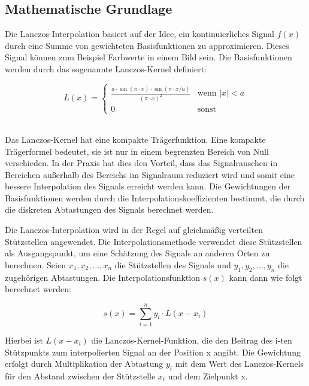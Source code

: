 \subsection{Mathematische Grundlage}

    Die Lanczos-Interpolation basiert auf der Idee, ein kontinuierliches Signal $f(x)$ durch eine Summe von gewichteten Basisfunktionen zu approximieren. 
    Dieses Signal können zum Beispiel Farbwerte in einem Bild sein.
    Die Basisfunktionen werden durch das sogenannte Lanczos-Kernel definiert:

\begin{equation}
    L(x) = \begin{cases} \frac{a \cdot \sin(\pi \cdot x) \cdot \sin(\pi \cdot x / a)}{(\pi \cdot x)^2} & \text{wenn } \left| x \right| < a \\ 0 & \text{sonst} \end{cases}
\end{equation}
~

Das Lanczos-Kernel hat eine kompakte Trägerfunktion.
Eine kompakte Trägerformel bedeutet, sie ist nur in einem begrenzten Bereich von Null verschieden. 
In der Praxis hat dies den Vorteil, dass das Signalrauschen in Bereichen außerhalb des Bereichs im Signalraum reduziert wird und somit eine bessere Interpolation des Signals erreicht werden kann.
Die Gewichtungen der Basisfunktionen werden durch die Interpolationskoeffizienten bestimmt, die durch die diskreten Abtastungen des Signals berechnet werden.

Die Lanczos-Interpolation wird in der Regel auf gleichmäßig verteilten Stützstellen angewendet. 
Die Interpolationsmethode verwendet diese Stützstellen als Ausgangspunkt, um eine Schätzung des Signals an anderen Orten zu berechnen. 
Seien $x_1, x_2, \ldots, x_n$ die Stützstellen des Signals und $y_1, y_2, \ldots, y_n$ die zugehörigen Abtastungen.
Die Interpolationsfunktion $s(x)$ kann dann wie folgt berechnet werden:

\begin{equation}
    s(x) = \sum_{i=1}^{n} y_i \cdot L(x - x_i)
\end{equation}

Hierbei ist $L(x - x_i)$ die Lanczos-Kernel-Funktion, die den Beitrag des i-ten Stützpunkts zum interpolierten Signal an der Position x angibt.
Die Gewichtung erfolgt durch Multiplikation der Abtastung $y_i$ mit dem Wert des Lanczos-Kernels für den Abstand zwischen der Stützstelle $x_i$ und dem Zielpunkt x.

